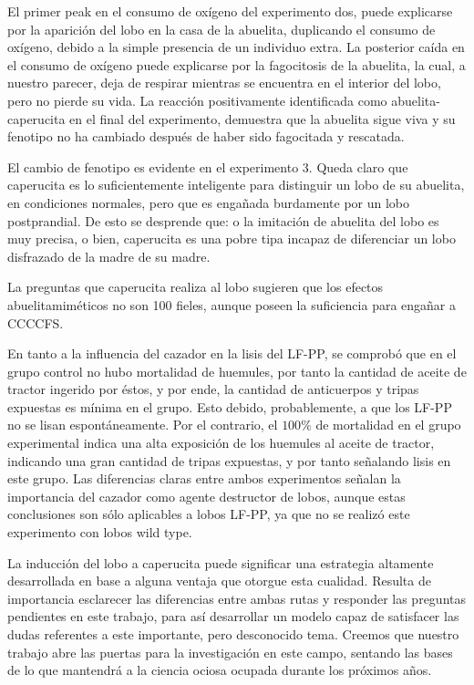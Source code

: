 \documentclass[fleqn,10pt]{AmateCodex} %
\begin{document}
El primer peak en el consumo de oxígeno del
experimento dos, puede explicarse por la aparición
del lobo en la casa de la abuelita, duplicando el
consumo de oxígeno, debido a la simple presencia de
un individuo extra. La posterior caída en el consumo
de oxígeno puede explicarse por la fagocitosis de la
abuelita, la cual, a nuestro parecer, deja de respirar
mientras se encuentra en el interior del lobo, pero no
pierde su vida. La reacción positivamente
identificada como abuelita-caperucita en el final del
experimento, demuestra que la abuelita sigue viva y
su fenotipo no ha cambiado después de haber sido
fagocitada y rescatada.

El cambio de fenotipo es evidente en el experimento
3. Queda claro que caperucita es lo suficientemente
inteligente para distinguir un lobo de su abuelita, en
condiciones normales, pero que es engañada
burdamente por un lobo postprandial. De esto se
desprende que: o la imitación de abuelita del lobo es
muy precisa, o bien, caperucita es una pobre tipa
incapaz de diferenciar un lobo disfrazado de la
madre de su madre.

La preguntas que caperucita realiza al lobo sugieren
que los efectos abuelitamiméticos no son 100%
fieles, aunque poseen la suficiencia para engañar a
CCCCFS.

En tanto a la influencia del cazador en la lisis del
LF-PP, se comprobó que en el grupo control no hubo
mortalidad de huemules, por tanto la cantidad de
aceite de tractor ingerido por éstos, y por ende, la
cantidad de anticuerpos y tripas expuestas es mínima
en el grupo. Esto debido, probablemente, a que los
LF-PP no se lisan espontáneamente. Por el contrario,
el $100\%$ de mortalidad en el grupo experimental
indica una alta exposición de los huemules al aceite
de tractor, indicando una gran cantidad de tripas
expuestas, y por tanto señalando lisis en este grupo.
Las diferencias claras entre ambos experimentos
señalan la importancia del cazador como agente
destructor de lobos, aunque estas conclusiones son
sólo aplicables a lobos LF-PP, ya que no se realizó
este experimento con lobos wild type.

La inducción del lobo a caperucita puede significar
una estrategia altamente desarrollada en base a
alguna ventaja que otorgue esta cualidad. Resulta de
importancia esclarecer las diferencias entre ambas
rutas y responder las preguntas pendientes en este
trabajo, para así desarrollar un modelo capaz de
satisfacer las dudas referentes a este importante, pero
desconocido tema. Creemos que nuestro trabajo abre
las puertas para la investigación en este campo,
sentando las bases de lo que mantendrá a la ciencia
ociosa ocupada durante los próximos años.
\end{document}
